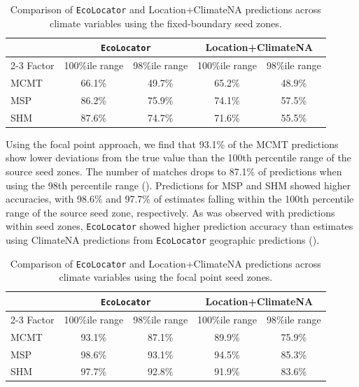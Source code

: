\documentclass[]{article}
\newcommand{\ecolocator}{\texttt{EcoLocator}\xspace}
\begin{document}
\begin{table}[ht]
  \centering
  \caption{Comparison of \ecolocator and Location+ClimateNA predictions across climate variables using the fixed-boundary seed zones.}
  \label{tab:table1}
  \begin{tabular}{lcccc}
  \hline
   & \multicolumn{2}{c}{\ecolocator} & \multicolumn{2}{c}{Location+ClimateNA} \\
  \cline{2-3} \cline{4-5}
  Factor & 100\%ile range & 98\%ile range & 100\%ile range & 98\%ile range \\
  \hline
  MCMT & 66.1\% & 49.7\% & 65.2\% & 48.9\% \\
  MSP  & 86.2\% & 75.9\% & 74.1\% & 57.5\% \\
  SHM  & 87.6\% & 74.7\% & 71.6\% & 55.5\% \\
\hline
\end{tabular}
\end{table}

Using the focal point approach, we find that 93.1\% of the MCMT predictions 
show lower deviations from the true value than the 100th percentile 
range of the source seed zones. The number of matches 
drops to 87.1\% of predictions when using the 98th percentile range 
(). Predictions for MSP and SHM showed higher accuracies,
with 98.6\% and 97.7\% of estimates falling within the 100th 
percentile range of the source seed zone, respectively. As was observed with 
predictions within seed zones, \ecolocator showed higher prediction 
accuracy than estimates using ClimateNA predictions from \ecolocator 
geographic predictions ().

\begin{table}[ht]
  \centering
  \caption{Comparison of \ecolocator and Location+ClimateNA predictions across climate variables using the focal point seed zones.}
  \label{tab:table2}
  \begin{tabular}{lcccc}
  \hline
   & \multicolumn{2}{c}{\ecolocator} & \multicolumn{2}{c}{Location+ClimateNA} \\
  \cline{2-3} \cline{4-5}
  Factor & 100\%ile range & 98\%ile range & 100\%ile range & 98\%ile range \\
  \hline
  MCMT & 93.1\% & 87.1\% & 89.9\% & 75.9\% \\
  MSP  & 98.6\% & 93.1\% & 94.5\% & 85.3\% \\
  SHM  & 97.7\% & 92.8\% & 91.9\% & 83.6\% \\
  \hline
  \end{tabular}
\end{table}
\end{document}

